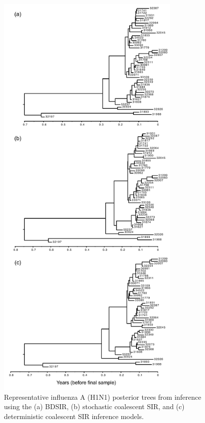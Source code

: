 \documentclass[12pt,titlepage]{article}
\newcommand{\stochCoalSIR}{stochastic coalescent SIR}
\newcommand{\deterCoalSIR}{deterministic coalescent SIR}
\newcommand{\BDSIR}{BDSIR}
\begin{document}
\begin{figure}[ht]
    \centering
    	\includegraphics[width=3.5in]{Fig4.pdf}
\caption{Representative influenza A (H1N1) posterior trees from inference using the (a) \BDSIR{}, (b) \stochCoalSIR{}, and (c) \deterCoalSIR{} inference models.
}
\end{figure}
%
%
\end{document}

